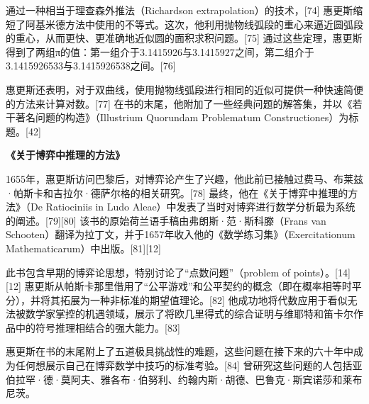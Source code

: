 通过一种相当于理查森外推法（Richardson extrapolation）的技术，[74] 惠更斯缩短了阿基米德方法中使用的不等式。这次，他利用抛物线弧段的重心来逼近圆弧段的重心，从而更快、更准确地近似圆的面积求积问题。[75] 通过这些定理，惠更斯得到了两组π的值：第一组介于3.1415926与3.1415927之间，第二组介于3.1415926533与3.1415926538之间。[76]

惠更斯还表明，对于双曲线，使用抛物线弧段进行相同的近似可提供一种快速简便的方法来计算对数。[77] 在书的末尾，他附加了一些经典问题的解答集，并以《若干著名问题的构造》（Illustrium Quorundam Problematum Constructiones）为标题。[42]

\textbf{《关于博弈中推理的方法》}

1655年，惠更斯访问巴黎后，对博弈论产生了兴趣，他此前已接触过费马、布莱兹·帕斯卡和吉拉尔·德萨尔格的相关研究。[78] 最终，他在《关于博弈中推理的方法》（De Ratiociniis in Ludo Aleae）中发表了当时对博弈进行数学分析最为系统的阐述。[79][80] 该书的原始荷兰语手稿由弗朗斯·范·斯科滕（Frans van Schooten）翻译为拉丁文，并于1657年收入他的《数学练习集》（Exercitationum Mathematicarum）中出版。[81][12]

此书包含早期的博弈论思想，特别讨论了“点数问题”（problem of points）。[14][12] 惠更斯从帕斯卡那里借用了“公平游戏”和公平契约的概念（即在概率相等时平分），并将其拓展为一种非标准的期望值理论。[82] 他成功地将代数应用于看似无法被数学家掌控的机遇领域，展示了将欧几里得式的综合证明与维耶特和笛卡尔作品中的符号推理相结合的强大能力。[83]

惠更斯在书的末尾附上了五道极具挑战性的难题，这些问题在接下来的六十年中成为任何想展示自己在博弈数学中技巧的标准考验。[84] 曾研究这些问题的人包括亚伯拉罕·德·莫阿夫、雅各布·伯努利、约翰内斯·胡德、巴鲁克·斯宾诺莎和莱布尼茨。